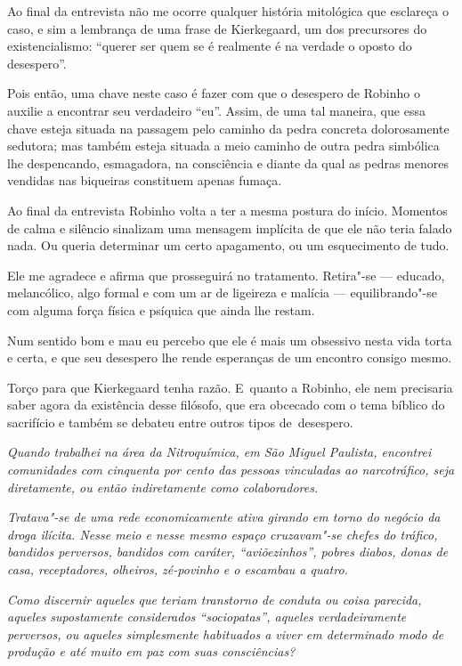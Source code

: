 \asterisc{}

Ao final da entrevista não me ocorre qualquer história mitológica que
esclareça o caso, e sim a lembrança de uma frase de Kierkegaard, um dos
precursores do existencialismo: ``querer ser quem se é realmente é na
verdade o oposto do desespero''.

Pois então, uma chave neste caso é fazer com que o desespero de Robinho
o auxilie a encontrar seu verdadeiro ``eu''. Assim, de uma tal maneira,
que essa chave esteja situada na passagem pelo caminho da pedra concreta
dolorosamente sedutora; mas também esteja situada a meio caminho de
outra pedra simbólica lhe despencando, esmagadora, na consciência e
diante da qual as pedras menores vendidas nas biqueiras constituem
apenas fumaça.

Ao final da entrevista Robinho volta a ter a mesma postura do início.
Momentos de calma e silêncio sinalizam uma mensagem implícita de que ele
não teria falado nada. Ou queria determinar um certo apagamento, ou um
esquecimento de tudo.

Ele me agradece e afirma que prosseguirá no tratamento. Retira"-se ---
educado, melancólico, algo formal e com um ar de ligeireza e malícia ---
equilibrando"-se com alguma força física e psíquica que ainda lhe restam.

Num sentido bom e mau eu percebo que ele é mais um obsessivo nesta vida
torta e certa, e que seu desespero lhe rende esperanças de um encontro
consigo mesmo.

Torço para que Kierkegaard tenha razão. E~quanto a Robinho, ele nem
precisaria saber agora da existência desse filósofo, que era obcecado
com o tema bíblico do sacrifício e também se debateu entre outros tipos
de~desespero.

\asterisc{}

\emph{Quando trabalhei na área da Nitroquímica, em
São Miguel Paulista, encontrei comunidades com cinquenta por cento das
pessoas vinculadas ao narcotráfico, seja diretamente, ou então
indiretamente como colaboradores.}

\emph{Tratava"-se de uma rede economicamente ativa girando em torno do
negócio da droga ilícita. Nesse meio e nesse mesmo espaço cruzavam"-se
chefes do tráfico, bandidos perversos, bandidos com caráter,
``aviõezinhos'', pobres diabos, donas de casa, receptadores, olheiros,
zé-povinho e o escambau a quatro.}

\emph{Como discernir aqueles que teriam transtorno
de conduta ou coisa parecida, aqueles supostamente considerados
``sociopatas'', aqueles verdadeiramente perversos, ou aqueles
simplesmente habituados a viver em determinado modo de produção e até
muito em paz com suas consciências?}


